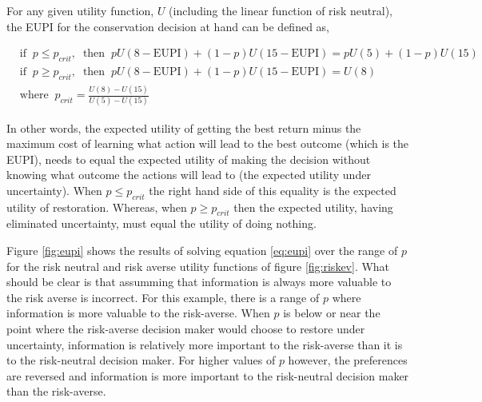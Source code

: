 \documentclass[]{article}
\theoremstyle{definition}
\theoremstyle{definition}
\theoremstyle{definition}
\theoremstyle{remark}
\begin{document}
For any given utility function, \(U\) (including the linear function of
risk neutral), the EUPI for the conservation decision at hand can be
defined as,

\begin{equation}
\begin{split}
&\textrm{if}\;\;p \leq p_\textit{crit},\;\;\textrm{then}\;\;pU(8 - \mathrm{EUPI}) + (1 - p)U(15 - \mathrm{EUPI}) = pU(5) + (1 - p)U(15) \\
&\textrm{if}\;\;p \geq p_\textit{crit},\;\;\textrm{then}\;\;pU(8 - \mathrm{EUPI}) + (1 - p)U(15 - \mathrm{EUPI}) = U(8)\\
& \textrm{where}\;\; p_\textit{crit} = \frac{U(8) - U(15)}{U(5) - U(15)}
\label{eq:eupi}
\end{split}
\end{equation}

In other words, the expected utility of getting the best return minus
the maximum cost of learning what action will lead to the best outcome
(which is the EUPI), needs to equal the expected utility of making the
decision without knowing what outcome the actions will lead to (the
expected utility under uncertainty). When \(p \leq p_\textit{crit}\) the
right hand side of this equality is the expected utility of restoration.
Whereas, when \(p \geq p_\textit{crit}\) then the expected utility,
having eliminated uncertainty, must equal the utility of doing nothing.

Figure \ref{fig:eupi} shows the results of solving equation
\eqref{eq:eupi} over the range of \(p\) for the risk neutral and risk
averse utility functions of figure \ref{fig:riskev}. What should be
clear is that assumming that information is always more valuable to the
risk averse is incorrect. For this example, there is a range of \(p\)
where information is more valuable to the risk-averse. When \(p\) is
below or near the point where the risk-averse decision maker would
choose to restore under uncertainty, information is relatively more
important to the risk-averse than it is to the risk-neutral decision
maker. For higher values of \(p\) however, the preferences are reversed
and information is more important to the risk-neutral decision maker
than the risk-averse.
\end{document}
